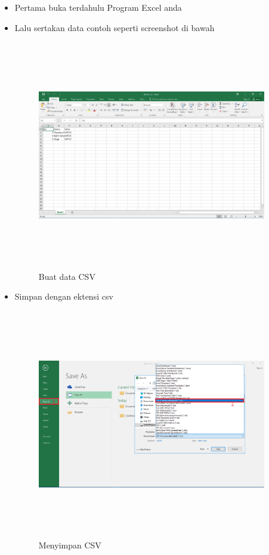 \begin{enumerate}
\begin{itemize}
	\item Pertama buka terdahulu Program Excel anda
	\item Lalu sertakan data contoh seperti screenshot di bawah
	\begin{figure}[!htbp]
	\centering
	\includegraphics[width=10cm,height=10cm]{figures/contohmembuatcsvdengandata.png}
	\caption{Buat data CSV}
	\label{penanda}
	\end{figure}


 	\item Simpan dengan ektensi csv
	\begin{figure}[!htbp]
	\centering
	\includegraphics[width=10cm,height=10cm]{figures/menyimpanfiledenganformatcsv.png}
	\caption{Menyimpan CSV}
	\label{penanda}
	\end{figure}


\end{itemize}
\end{enumerate}
